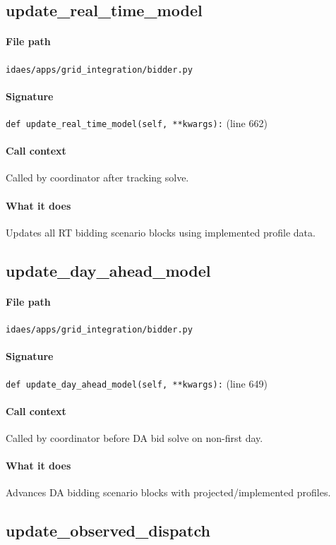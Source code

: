 \documentclass{article}
\begin{document}
\subsection{update\_real\_time\_model}\label{fn:update_real_time_model}
\paragraph{File path} \texttt{idaes/apps/grid\_integration/bidder.py}
\paragraph{Signature} \texttt{def update\_real\_time\_model(self, **kwargs):} (line 662)
\paragraph{Call context} Called by coordinator after tracking solve.
\paragraph{What it does} Updates all RT bidding scenario blocks using implemented profile data.

\subsection{update\_day\_ahead\_model}\label{fn:update_day_ahead_model}
\paragraph{File path} \texttt{idaes/apps/grid\_integration/bidder.py}
\paragraph{Signature} \texttt{def update\_day\_ahead\_model(self, **kwargs):} (line 649)
\paragraph{Call context} Called by coordinator before DA bid solve on non-first day.
\paragraph{What it does} Advances DA bidding scenario blocks with projected/implemented profiles.

\subsection{update\_observed\_dispatch}\label{fn:update_observed_dispatch}
\end{document}
